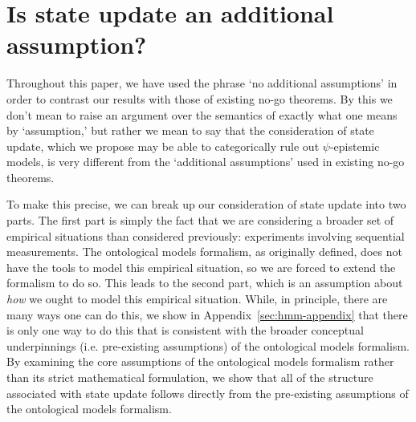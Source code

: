 \documentclass[%
 reprint,
superscriptaddress,
nofootinbib,
 amsmath,amssymb,
 prx, 
 accepted=2019-09-27,
]{quantumarticle}
\begin{document}
 
%  


\clearpage

\appendix

\section{Is state update an additional assumption?}
\label{sec:additional-assumption}

Throughout this paper, we have used the phrase `no additional
assumptions' in order to contrast our results with those of existing
no-go theorems. By this we don't mean to raise an argument over the
semantics of exactly what one means by `assumption,' but rather we
mean to say that the consideration of state update, which we propose
may be able to categorically rule out $\psi$-epistemic models, is very
different from the `additional assumptions' used in existing no-go
theorems.

To make this precise, we can break up our consideration of state
update into two parts. The first part is simply the fact that we are
considering a broader set of empirical situations than considered
previously: experiments involving sequential measurements. The
ontological models formalism, as originally defined, does not have the
tools to model this empirical situation, so we are forced to extend
the formalism to do so. This leads to the second part, which is an
assumption about \emph{how} we ought to model this empirical
situation. While, in principle, there are many ways one can do this,
we show in Appendix~\ref{sec:hmm-appendix} that there is only one way
to do this that is consistent with the broader conceptual
underpinnings (i.e. pre-existing assumptions) of the ontological
models formalism. By examining the core assumptions of the ontological
models formalism rather than its strict mathematical formulation, we
show that all of the structure associated with state update follows
directly from the pre-existing assumptions of the ontological models
formalism.
\end{document}
